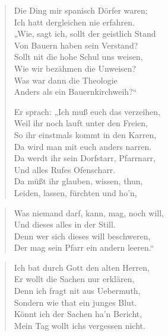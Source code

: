 \begin{verse}
Die Ding mir spanisch Dörfer waren;\\
Ich hatt dergleichen nie erfahren.\\
„Wie, sagt ich, sollt der geistlich Stand\\
Von Bauern haben sein Verstand?\\
Sollt nit die hohe Schul uns weisen,\\
Wie wir bezähmen die Unweisen?\\
Was war dann die Theologie\\
Anders als ein Bauernkirchweih?“

Er sprach: „Ich muß euch das verzeihen,\\
Weil ihr noch lauft unter den Freien,\\
So ihr einstmals kommt in den Karren,\\
Da wird man mit euch anders narren.\\
Da werdt ihr sein Dorfstarr, Pfarrnarr,\\
Und alles Rufes Ofenscharr.\\
Da müßt ihr glauben, wissen, thun,\\
Leiden, lassen, fürchten und ho’n,
\end{verse}

\begin{quote}
Was niemand darf, kann, mag, noch will,\\
Und dieses alles in der Still.\\
Denn wer sich dieses will beschweren,\\
Der mag sein Pfarr ein andern leeren.“
\end{quote}

\begin{verse}
Ich bat durch Gott den alten Herren,\\
Er wollt die Sachen nur erklären,\\
Denn ich fragt nit aus Uebermuth,\\
Sondern wie that ein junges Blut.\\
Könnt ich der Sachen ha’n Bericht,\\
Mein Tag wollt ichs vergessen nicht.
\end{verse}


